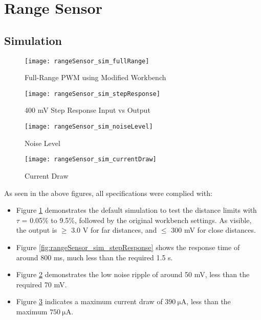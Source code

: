 \graphicspath{{content/3_results/figures}}
\section{Range Sensor}\label{sec:range_sensor_results}

\subsection{Simulation}

\begin{figure}[!htb]
    \centering
    \texttt{[image: rangeSensor\_sim\_fullRange]}
    \caption{Full-Range PWM using Modified Workbench}
    \label{fig:rangeSensor_sim_fullRange}
\end{figure}

\begin{figure}[!h]
    \centering
    \begin{minipage}{0.45\textwidth}
        \centering
        \texttt{[image: rangeSensor\_sim\_stepResponse]}
        \caption{400 mV Step Response Input vs Output}
        \label{fig:rangeSensor_sim_stepResponse}
    \end{minipage}
    \begin{minipage}{0.45\textwidth}
        \centering
        \texttt{[image: rangeSensor\_sim\_noiseLevel]}
        \caption{Noise Level}
        \label{fig:rangeSensor_sim_noiseLevel}
    \end{minipage}
\end{figure}

\begin{figure}[!htb]
    \centering
    \texttt{[image: rangeSensor\_sim\_currentDraw]}
    \caption{Current Draw}
    \label{fig:rangeSensor_sim_currentDraw}
\end{figure}

As seen in the above figures, all specifications were complied with:
\begin{itemize}
    \item Figure \ref{fig:rangeSensor_sim_fullRange} demonstrates the default simulation to test the distance limits with $\tau$ = 0.05\% to 9.5\%,
          followed by the original workbench settings. As visible, the output is $\geq$ 3.0 V for far distances, and $\leq$ 300 mV for close distances.
    \item Figure \ref{fig:rangeSensor_sim_stepResponse} shows the response time of around 800 ms, much less than the required 1.5 s.
    \item Figure \ref{fig:rangeSensor_sim_noiseLevel} demonstrates the low noise ripple of around 50 mV, less than the required 70 mV.
    \item Figure \ref{fig:rangeSensor_sim_currentDraw} indicates a maximum current draw of $\SI{390}{\micro\ampere}$, less than the maximum $\SI{750}{\micro\ampere}$.

\end{itemize}

